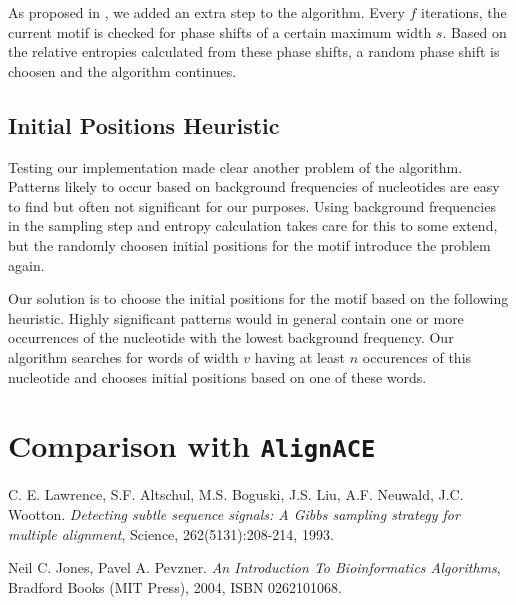 \documentclass[a4paper,11pt]{article}
\begin{document}
As proposed in \cite{Lawrence93}, we added an extra step to the algorithm.
Every $f$ iterations, the current motif is checked for phase shifts of a
certain maximum width $s$. Based on the relative entropies calculated from
these phase shifts, a random phase shift is choosen and the algorithm
continues.


\subsection*{Initial Positions Heuristic}

Testing our implementation made clear another problem of the algorithm.
Patterns likely to occur based on background frequencies of nucleotides are
easy to find but often not significant for our purposes. Using background
frequencies in the sampling step and entropy calculation takes care for this
to some extend, but the randomly choosen initial positions for the motif
introduce the problem again.

Our solution is to choose the initial positions for the motif based on the
following heuristic. Highly significant patterns would in general contain one
or more occurrences of the nucleotide with the lowest background frequency.
Our algorithm searches for words of width $v$ having at least $n$ occurences
of this nucleotide and chooses initial positions based on one of these words.


\section{Comparison with \texttt{AlignACE}}




\begin{thebibliography}{99}

C. E. Lawrence, S.F. Altschul, M.S. Boguski, J.S. Liu,
A.F. Neuwald, J.C. Wootton. \emph{Detecting subtle sequence signals: A Gibbs
sampling strategy for multiple alignment}, Science, 262(5131):208-214, 1993.

Neil C. Jones, Pavel A. Pevzner. \emph{An Introduction To
Bioinformatics Algorithms}, Bradford Books (MIT Press), 2004, ISBN 0262101068.

\end{thebibliography}
\end{document}
